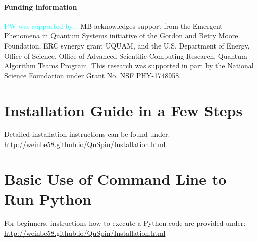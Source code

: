 \documentclass{SciPost}
\newcommand\0{\scalebox{-1}[1]{0}}
\newcommand*{\cyan}{\textcolor{cyan}}
\begin{document}
\paragraph{Funding information}
\cyan{PW was supported by...}
MB acknowledges support from the Emergent Phenomena in Quantum Systems initiative of the Gordon and Betty Moore Foundation, ERC synergy grant UQUAM, and the U.S. Department of Energy, Office of Science, Office of Advanced Scientific Computing Research, Quantum Algorithm Teams Program. This research was supported in part by the National Science Foundation under Grant No. NSF PHY-1748958.
\begin{appendix}
	
\section{Installation Guide in a Few Steps}
\label{app:install}
	
Detailed installation instructions can be found under:\\
	
\href{http://weinbe58.github.io/QuSpin/Installation.html}{http://weinbe58.github.io/QuSpin/Installation.html}\\
	
	
	
\section{Basic Use of Command Line to Run Python}
\label{app:cmd_line}

For beginners, instructions how to execute a Python code are provided under:\\

\href{http://weinbe58.github.io/QuSpin/Installation.html}{http://weinbe58.github.io/QuSpin/Installation.html}\\
	

\end{appendix}
\end{document}
